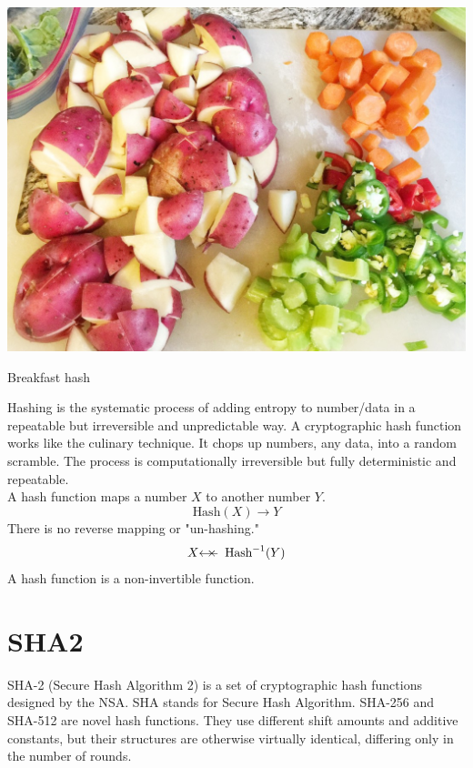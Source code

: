 \documentclass{tufte-handout}
\begin{document}

\begin{marginfigure}[20 pt]%
  \includegraphics[width=\linewidth]{hash.jpg}
  \caption{Breakfast hash }
  \label{fig:marginfig}
\end{marginfigure}


Hashing is the systematic process of adding entropy to number/data in a repeatable but irreversible and unpredictable way.  A cryptographic hash function works like the culinary technique.  It chops up numbers, any data, into a random scramble.  The process is computationally irreversible but fully deterministic and repeatable.  \\

A hash function maps a number $X$ to another number $Y$.
$$\text{Hash}(X)\longrightarrow Y$$
There is no reverse mapping or "un-hashing."  
$$X\mathrlap{\longleftarrow}{\ \ \Large \times}\ \  \text{Hash}^{-1}(Y)$$
A hash function is a non-invertible function.

\section{SHA2}
SHA-2 (Secure Hash Algorithm 2) is a set of cryptographic hash functions designed by the NSA. SHA stands for Secure Hash Algorithm. SHA-256 and SHA-512 are novel hash functions.  They use different shift amounts and additive constants, but their structures are otherwise virtually identical, differing only in the number of rounds.
\end{document}
